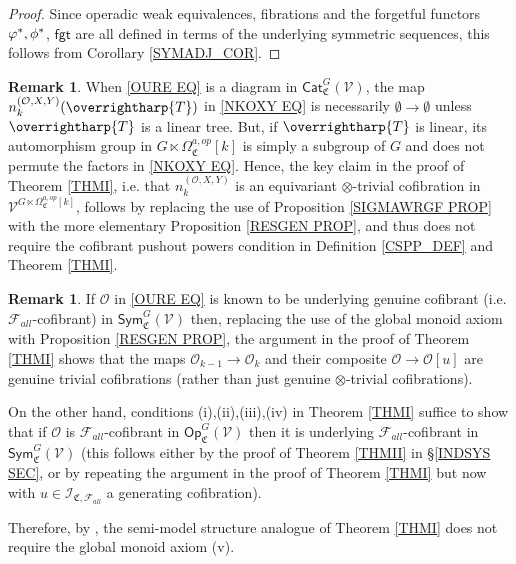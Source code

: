 \documentclass[a4paper,10pt
,draft
]{article}%
\numberwithin{equation}{section}
\numberwithin{figure}{section}
\theoremstyle{definition} %
\newtheorem{remark}[equation]{Remark}%
\newcommand{\vect}[1]{\text{\overrightharp{\ensuremath{#1}}}}
\newcommand{\F}{\ensuremath{\mathcal F}}
\newcommand{\V}{\ensuremath{\mathcal V}}
\renewcommand{\O}{\ensuremath{\mathcal O}}
\newcommand{\1}{\ensuremath{\mathbbm 1}}%
\begin{document}
\begin{proof}
	Since operadic weak equivalences, fibrations and the forgetful functors $\varphi^{\**},\phi^{\**}$, $\mathsf{fgt}$
	are all defined in terms of the underlying symmetric sequences,
	this follows from Corollary \ref{SYMADJ_COR}.
\end{proof}






\begin{remark}\label{CSPNTHI REM}
When \eqref{OURE EQ}
is a diagram in $\mathsf{Cat}^G_{\mathfrak{C}}(\V)$, 
the map 
$n_k^{(\mathcal{O},X,Y)}(\vect{T})$
in \eqref{NKOXY EQ}
is necessarily $\emptyset \to \emptyset$
unless $\vect{T}$ is a linear tree.
But, if $\vect{T}$ is linear,
its automorphism group in 
$G \ltimes \Omega_{\mathfrak{C}}^{a,op}[k]$
is simply a subgroup of $G$
and does not permute the factors in \eqref{NKOXY EQ}.
Hence, the key claim in the proof of Theorem \ref{THMI},
i.e. that 
$n_k^{(\mathcal{O},X,Y)}$
is an equivariant $\otimes$-trivial cofibration in
$\V^{G \ltimes \Omega_{\mathfrak{C}}^{a,op}[k]}$,
follows by replacing the use of Proposition \ref{SIGMAWRGF PROP}
with the more elementary
Proposition \ref{RESGEN PROP},
and thus does not require
the cofibrant pushout powers condition
in Definition \ref{CSPP_DEF} and Theorem \ref{THMI}.
\end{remark}




\begin{remark}\label{THMISM REM}
	If $\O$ in \eqref{OURE EQ}
	is known to be underlying genuine cofibrant
	(i.e. $\F_{all}$-cofibrant) in 
	$\mathsf{Sym}^{G}_{\mathfrak{C}}(\V)$ 
	then, replacing the use of the global monoid axiom with 
	Proposition \ref{RESGEN PROP},
	the argument in the proof of Theorem \ref{THMI}
	shows that the maps
	$\O_{k-1} \to \O_k$
	and their composite
	$\O \to \O[u]$
	are genuine trivial cofibrations
	(rather than just genuine $\otimes$-trivial cofibrations).
	
	On the other hand, conditions (i),(ii),(iii),(iv) in Theorem \ref{THMI}
	suffice to show that if $\O$ is $\mathcal{F}_{all}$-cofibrant in 
	$\mathsf{Op}^G_{\mathfrak{C}}(\V)$
	then it is underlying $\mathcal{F}_{all}$-cofibrant in 
	$\mathsf{Sym}^G_{\mathfrak{C}}(\V)$
	(this follows either by the proof of Theorem \ref{THMII} in \S \ref{INDSYS SEC},
	or by repeating the argument in the proof of Theorem \ref{THMI} but now with $u \in \mathcal{I}_{\mathfrak{C},\F_{all}}$
	a generating cofibration).
	
	Therefore, by \cite[Thm. 2.2.2]{WY18},
	the semi-model structure analogue of Theorem \ref{THMI}
	does not require the global monoid axiom (v).
\end{remark}
  
\end{document}
